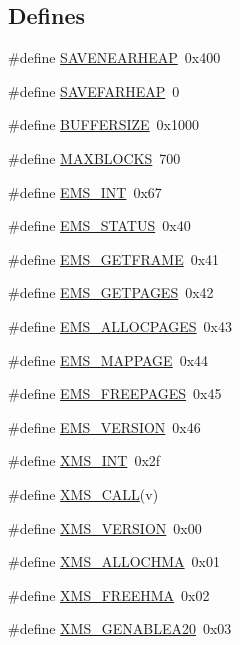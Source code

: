 \subsection*{Defines}
\begin{DoxyCompactItemize}
\item 
\#define \hyperlink{ID__MM_8H_aae2bf5419bb54baf6864ac61e921a0fa}{SAVENEARHEAP}~0x400
\item 
\#define \hyperlink{ID__MM_8H_a76d773b5086b48d570f8c56936bf7ab6}{SAVEFARHEAP}~0
\item 
\#define \hyperlink{ID__MM_8H_ac3146f1e9227301bb4aa518f4d336cee}{BUFFERSIZE}~0x1000
\item 
\#define \hyperlink{ID__MM_8H_a02723c1cf9784c591e45af7bf584f97c}{MAXBLOCKS}~700
\item 
\#define \hyperlink{ID__MM_8H_acd011a2241fb19017a600b5aecbd5968}{EMS\_\-INT}~0x67
\item 
\#define \hyperlink{ID__MM_8H_aa19e546b41ba325f24ec351a1adf1f01}{EMS\_\-STATUS}~0x40
\item 
\#define \hyperlink{ID__MM_8H_ae587fb5995f365cfbdec7d991c77c944}{EMS\_\-GETFRAME}~0x41
\item 
\#define \hyperlink{ID__MM_8H_adffbff7cd41dc46f3c0b8a78392cea43}{EMS\_\-GETPAGES}~0x42
\item 
\#define \hyperlink{ID__MM_8H_a4852ea6a018ce47dad32b40fa23afbba}{EMS\_\-ALLOCPAGES}~0x43
\item 
\#define \hyperlink{ID__MM_8H_a60b5eae2d94d2727d2b6f50b85db2c05}{EMS\_\-MAPPAGE}~0x44
\item 
\#define \hyperlink{ID__MM_8H_a5496ceab7bc880d5031619abc2e0acd6}{EMS\_\-FREEPAGES}~0x45
\item 
\#define \hyperlink{ID__MM_8H_a14534b9476f04c3a6665005d3e5c20c0}{EMS\_\-VERSION}~0x46
\item 
\#define \hyperlink{ID__MM_8H_a94da1da118f3e64499e6b8cd48885c14}{XMS\_\-INT}~0x2f
\item 
\#define \hyperlink{ID__MM_8H_a8a07e202e8e0edc4cfc8ccf56cad70e4}{XMS\_\-CALL}(v)
\item 
\#define \hyperlink{ID__MM_8H_a1bfcfd9911af188ce73f06cfbcee68a8}{XMS\_\-VERSION}~0x00
\item 
\#define \hyperlink{ID__MM_8H_aa799388b39d5bdd80ab40608e6314114}{XMS\_\-ALLOCHMA}~0x01
\item 
\#define \hyperlink{ID__MM_8H_a5e467bc4aba6791ac66ebea00b600272}{XMS\_\-FREEHMA}~0x02
\item 
\#define \hyperlink{ID__MM_8H_a634a31daa0e9d69872d3f3335c8e8aa7}{XMS\_\-GENABLEA20}~0x03

\end{DoxyCompactItemize}
